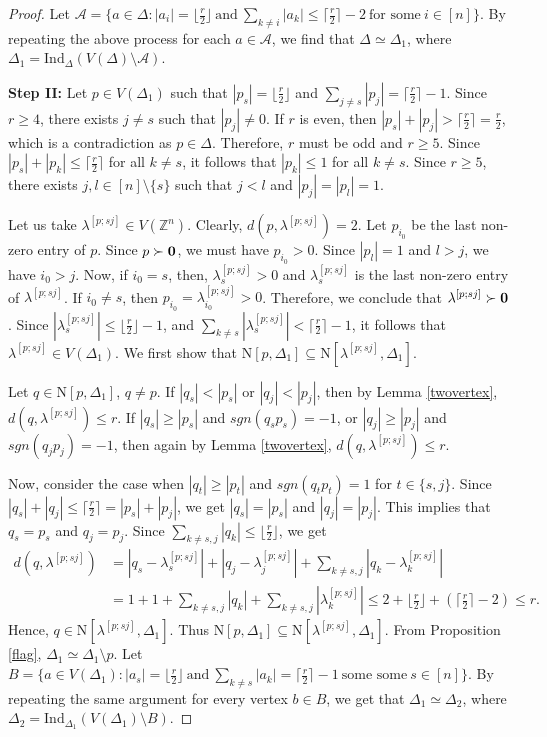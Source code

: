 \documentclass{amsart}
\theoremstyle{definition}
\theoremstyle{remark}
\numberwithin{equation}{section}
\newcommand{\D}{\Delta}
\newcommand{\f}{\lfloor\frac{r}{2}\rfloor}
\newcommand{\cil}{\lceil\frac{r}{2}\rceil}
\def\A{{\mathcal{A}}}
\def\Z{{\mathbb{Z}}}
\def\n{{\mathrm{N}}}
\begin{document}
\begin{proof}
	Let $\A=\{a\in \D: |a_i|=\f\ \text{and}\ \sum_{k\neq i}|a_k|\leq \cil-2 \ \text{for some} \ i\in[n]\}$. By repeating the above process for each $a\in \A$, we find that $\D \simeq \D_1$, where $\D_1 = \mathrm{Ind}_{\D}(V(\D) \setminus \A)$. 
	
    \smallskip
	\noindent 
	\textbf{Step II:} Let $p \in V(\D_1)$ such that $|p_s| = \f$ and $\sum_{j \neq s} |p_j| = \cil - 1$. Since $r \geq 4$, there exists $j \neq s$ such that 
	$|p_j| \neq 0$. If $r$ is even, then $|p_s| + |p_j| >  \cil = \frac{r}{2}$, which is a contradiction as $p \in \Delta$. Therefore, $r$ must be odd and $r \geq 5$. 
	Since $|p_s|+|p_k|\leq \cil$ for all $k \neq s$, it follows that $|p_k|\leq 1$ for all $k \neq s$. Since $r\geq 5$, there exists $j,l\in [n] \setminus \{s\}$ such that  $j<l$ and $|p_j|  = |p_l|=1$. 
	
	Let us take $\lambda^{[p;sj]}\in V(\Z^n)$. Clearly, $d(p,\lambda^{[p;sj]})=2$. 
	Let $p_{i_0}$ be the last non-zero entry of $p$. Since $p\succ {\bf{0}}$, we must have $p_{i_0}>0$. Since $|p_l|=1$ and $l>j$, we have $i_0>j$. Now, if $i_0=s$, then, $\lambda^{[p;sj]}_s>0$ and $\lambda^{[p;sj]}_s$ is the last non-zero entry of $\lambda^{[p;sj]}$. If $i_0\neq s$, then $p_{i_0}=\lambda^{[p;sj]}_{i_0}>0$. Therefore, we conclude that $\lambda^{[p;sj]}\succ {\bf{0}}$. Since $|\lambda^{[p;sj]}_s|\leq \f-1$, and $\sum_{k\neq s}|\lambda^{[p;sj]}_s|< \cil-1$, it follows that $\lambda^{[p;sj]}\in V(\D_1)$. We first show that  $\n[p, \D_1] \subseteq \n[\lambda^{[p;sj]}, \D_1]$.
	
	
	Let $q \in \n[p, \D_1]$, $q \neq p$. If $|q_s| < |p_s|$ or $|q_j| < |p_j|$, then by Lemma \ref{twovertex}, $d(q, \lambda^{[p;sj]}) \leq r$. If $|q_s| \geq |p_s|$ and $sgn(q_s p_s) = -1$, or $|q_j| \geq |p_j|$ and $sgn(q_j p_j) = -1$, then again by Lemma \ref{twovertex}, $d(q, \lambda^{[p;sj]}) \leq r$.
	
	Now, consider the case when $|q_t| \geq |p_t|$ and $sgn(q_t p_t) = 1$ for $t\in\{s,j\}$. Since $|q_s|+|q_j|\leq \cil=|p_s|+|p_j|$,  we get $|q_s| = |p_s|$ and $|q_j| = |p_j|$. This implies that $q_s= p_s$ and $q_j = p_j$.
    Since  $\sum_{k \neq s,j} |q_k| \leq \f$, we get  
	$$
	\begin{aligned}
		d(q, \lambda^{[p;sj]}) &= |q_s - \lambda^{[p;sj]}_s| + |q_j - \lambda^{[p;sj]}_j| + \sum_{k \neq s,j} |q_k - \lambda^{[p;sj]}_k|\\ 
		&= 1 + 1 + \sum_{k \neq s,j} |q_k| + \sum_{k \neq s,j} |\lambda^{[p;sj]}_k| \leq 2 + \f + (\cil - 2) \leq r  .
	\end{aligned}
	$$
	Hence, $q \in \n[\lambda^{[p;sj]}, \D_1]$. Thus $\n[p, \D_1] \subseteq \n[\lambda^{[p;sj]}, \D_1]$. From Proposition \ref{flag},  $\D_1 \simeq \D_1 \setminus p$. 
	Let $B=\{a\in V(\D_1): |a_s|=\f\ \text{and}\ \sum_{k\neq s}|a_k|=\cil -1 \ \text{some some}\ s\in [n]\}$. By repeating the same argument for every vertex $b\in B $,  we get that $\D_1 \simeq \Delta_2$, where $ \Delta_2 = \mathrm{Ind}_{\D_1}(V(\D_1) \setminus B)$.
	

\end{proof}
\end{document}

